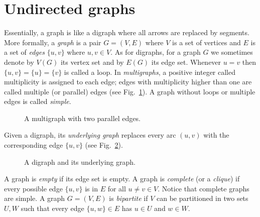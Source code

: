 \documentclass[a4paper]{book}
\theoremstyle{changebreak}                %
\begin{document}
\section{Undirected graphs}
\label{s:graph:undirected}
Essentially, a graph is like a digraph where all arrows are replaced
by segments. More formally, a {\it graph} is a pair
$G=(V,E)$ where $V$ is a set of vertices and $E$ is a set of {\it
  edges} $\{u,v\}$ where $u,v\in V$. As for digraphs, for
a graph $G$ we sometimes denote by $V(G)$ its vertex set and by $E(G)$
its edge set. Whenever $u=v$ then $\{u,v\}=\{u\}=\{v\}$ is called a
loop. In {\it multigraphs}, a positive integer
called multiplicity is assigned to each edge; edges with multiplicity
higher than one are called multiple (or parallel) edges (see
Fig.~\ref{fig:multigraph}). A graph without loops or multiple edges is
called {\it simple}.
\begin{figure}[!ht]
\begin{center}
\end{center}
\caption{A multigraph with two parallel edges.}
\label{fig:multigraph}
\end{figure}
Given a digraph, its \textit{underlying graph}
replaces every arc $(u,v)$ with the corresponding edge $\{u,v\}$ (see
Fig.~\ref{f:underlying}).
\begin{figure}[!ht]
\begin{center}
\begin{minipage}{5cm}
\end{minipage}
\hspace*{1cm}
\begin{minipage}{5cm}
\end{minipage}
\end{center}
\caption{A digraph and its underlying graph.}
\label{f:underlying}
\end{figure}
A graph is {\it empty} if its edge set is empty. A
graph is {\it complete}
(or a {\it clique}) if every possible edge $\{u,v\}$ is
in $E$ for all $u\not=v\in V$. Notice that complete graphs are
simple. A graph $G=(V,E)$ is {\it
  bipartite} if $V$ can be
partitioned in two sets $U,W$ such that every edge $\{u,w\}\in E$ has
$u\in U$ and $w\in W$.
\end{document}
